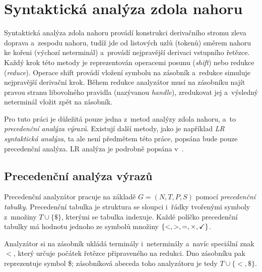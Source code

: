 \section{Syntaktická analýza zdola nahoru}\label{kap_sa_zdola_nahoru}
Syntaktická analýza zdola nahoru provádí konstrukci derivačního stromu zleva doprava a~zespodu nahoru, tudíž jde od listových uzlů (tokenů) směrem nahoru ke kořeni (výchozí neterminál) a~provádí nejpravější derivaci vstupního řetězce.
Každý krok této metody je reprezentován operacemi posunu (\emph{shift}) nebo redukce (\emph{reduce}).
Operace shift provádí vložení symbolu na zásobník a~redukce simuluje nejpravější derivační krok.
Během redukce analyzátor musí na zásobníku najít pravou stranu libovolného pravidla (nazývanou \emph{handle}), zredukovat jej a~výsledný neterminál vložit zpět na zásobník.

Pro tuto práci je důležitá pouze jedna z~metod analýzy zdola nahoru, a~to \emph{precedenční analýza výrazů}.
Existují další metody, jako je například \emph{LR syntaktická analýza}, ta ale není předmětem této práce, popsána bude pouze precedenční analýza.
LR analýza je podrobně popsána v~\cite{medunaElementsOfCompDesign}.

\subsection*{Precedenční analýza výrazů}
Precedenční analyzátor pracuje na základě $G = (N, T, P, S)$ pomocí \emph{precedenční tabulky}.
Precedenční tabulka je struktura se sloupci i~řádky tvořenými symboly z~množiny \mbox{$T \cup \{\$\}$}, kterými se tabulka indexuje.
Každé políčko precedenční tabulky má hodnotu jednoho ze symbolů množiny $\{<, >, =, \times, \text{\checkmark}\}$.

Analyzátor si na zásobník ukládá terminály i~neterminály a~navíc speciální znak $<$, který určuje počátek řetězce připraveného na redukci.
Dno zásobníku pak reprezentuje symbol \$; zásobníková abeceda toho analyzátoru je tedy $T \cup \{<, \$\}$.


